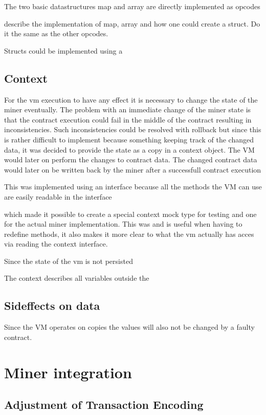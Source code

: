 The two basic datastructures map and array are directly implemented as opcodes



describe the implementation of map, array and how one could create a struct. Do it the same as the other opcodes.

Structs could be implemented using a 



\subsection{Context}
For the vm execution to have any effect it is necessary to change the state of the miner eventually. The problem with an immediate change of the miner state is that the contract execution could fail in the middle of the contract resulting in inconsistencies. Such inconsistencies could be resolved with rollback but since this is rather difficult to implement because something keeping track of the changed data, it was decided to provide the state as a copy in a context object. The VM would later on perform the changes to contract data. The changed contract data would later on be written back by the miner after a successfull contract execution


This was implemented using an interface because all the methods the VM can use are easily readable in the interface 

which made it possible to create a special context mock type for testing and one for the actual miner implementation. This was and is useful when having to redefine methods, it also makes it more clear to what the vm actually has acces via reading the context interface. 


Since the state of the vm is not persisted 

The context describes all variables outside the 

\subsection{Sideffects on data}

Since the VM operates on copies the values will also not be changed by a faulty contract.

\section{Miner integration}

\subsection{Adjustment of Transaction Encoding}

